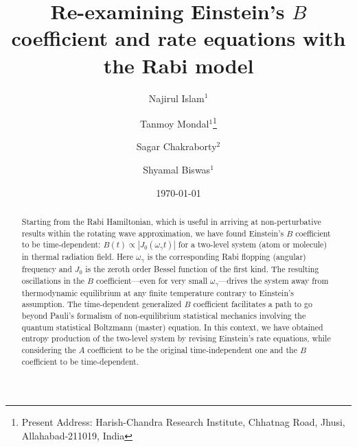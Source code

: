 \documentclass[aps,pra,twocolumn,showpacs,preprintnumbers,amsmath,amssymb,footinbib]{revtex4}
\begin{document}
\title{Re-examining Einstein's $B$ coefficient and rate equations with the Rabi model}

\author{Najirul Islam$^{1}$}
\author{Tanmoy Mondal$^{1}$\footnote{Present Address: Harish-Chandra Research Institute, Chhatnag Road, Jhusi, Allahabad-211019, India}}
\author{Sagar Chakraborty$^{2}$}
\author{Shyamal Biswas$^{1}$}



\date{\today}

\begin{abstract}
Starting from the Rabi Hamiltonian, which is useful in arriving at non-perturbative results within the rotating wave approximation, we have found Einstein's $B$ coefficient to be time-dependent: $B(t)\propto|J_0(\omega_\gamma t)|$ for a two-level system (atom or molecule) in thermal radiation field. Here $\omega_\gamma$ is the corresponding Rabi flopping (angular) frequency and $J_0$ is the zeroth order Bessel function of the first kind. The resulting oscillations in the $B$ coefficient---even for very small $\omega_\gamma$---drives the system away from thermodynamic equilibrium at any finite temperature contrary to Einstein's assumption. The time-dependent generalized $B$ coefficient facilitates a path to go beyond Pauli's formalism of non-equilibrium statistical mechanics involving the quantum statistical Boltzmann (master) equation. In this context, we have obtained entropy production of the two-level system by revising Einstein's rate equations, while considering the $A$ coefficient to be the original time-independent one and the $B$ coefficient to be time-dependent.
\end{abstract}


\maketitle
 
\end{document}
